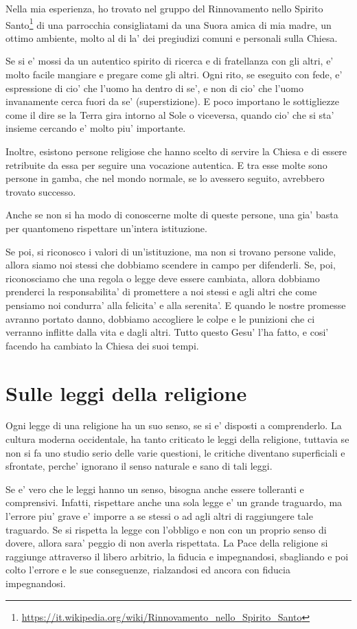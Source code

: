 Nella mia esperienza, ho trovato nel gruppo del Rinnovamento nello Spirito Santo\footnote{\url{https://it.wikipedia.org/wiki/Rinnovamento\_nello\_Spirito\_Santo}} di una parrocchia consigliatami da una Suora amica di mia madre, un ottimo ambiente, molto al di la' dei pregiudizi comuni e personali sulla Chiesa.

Se si e' mossi da un autentico spirito di ricerca e di fratellanza con gli altri, e' molto facile mangiare e pregare come gli altri. Ogni rito, se eseguito con fede, e' espressione di cio' che l'uomo ha dentro di se', e non di cio' che l'uomo invanamente cerca fuori da se' (superstizione). E poco importano le sottigliezze come il dire se la Terra gira intorno al Sole o viceversa, quando cio' che si sta' insieme cercando e' molto piu' importante.

Inoltre, esistono persone religiose che hanno scelto di servire la Chiesa e di essere retribuite da essa per seguire una vocazione autentica. E tra esse molte sono persone in gamba, che nel mondo normale, se lo avessero seguito, avrebbero trovato successo.

Anche se non si ha modo di conoscerne molte di queste persone, una gia' basta per quantomeno rispettare un'intera istituzione.

Se poi, si riconosco i valori di un'istituzione, ma non si trovano persone valide, allora siamo noi stessi che dobbiamo scendere in campo per difenderli. Se, poi, riconosciamo che una regola o legge deve essere cambiata, allora dobbiamo prenderci la responsabilita' di promettere a noi stessi e agli altri che come pensiamo noi condurra' alla felicita' e alla serenita'. E quando le nostre promesse avranno portato danno, dobbiamo accogliere le colpe e le punizioni che ci verranno inflitte dalla vita e dagli altri. Tutto questo Gesu' l'ha fatto, e cosi' facendo ha cambiato la Chiesa dei suoi tempi. 

\section{Sulle leggi della religione}

Ogni legge di una religione ha un suo senso, se si e' disposti a comprenderlo. La cultura moderna occidentale, ha tanto criticato le leggi della religione, tuttavia se non si fa uno studio serio delle varie questioni, le critiche diventano superficiali e sfrontate, perche' ignorano il senso naturale e sano di tali leggi.

Se e' vero che le leggi hanno un senso, bisogna anche essere tolleranti e comprensivi. Infatti, rispettare anche una sola legge e' un grande traguardo, ma l'errore piu' grave e' imporre a se stessi o ad agli altri di raggiungere tale traguardo. Se si rispetta la legge con l'obbligo e non con un proprio senso di dovere, allora sara' peggio di non averla rispettata. La Pace della religione si raggiunge attraverso il libero arbitrio, la fiducia e impegnandosi, sbagliando e poi colto l'errore e le sue conseguenze, rialzandosi ed ancora con fiducia impegnandosi.


